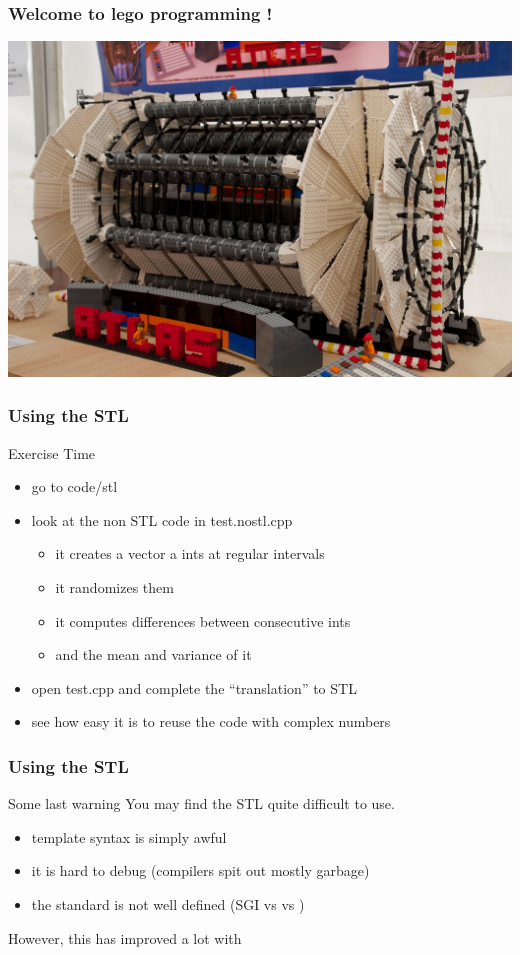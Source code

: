\begin{frame}[fragile]
  \frametitle{Welcome to lego programming !}
  \begin{block}{}
    \includegraphics[width=\linewidth]{AtlasLego}
  \end{block}
\end{frame}

\begin{frame}[fragile]
  \frametitle{Using the STL}
  \begin{alertblock}{Exercise Time}
    \begin{itemize}
    \item go to code/stl
    \item look at the non STL code in test.nostl.cpp 
      \begin{itemize}
        \item it creates a vector a ints at regular intervals
        \item it randomizes them
        \item it computes differences between consecutive ints
        \item and the mean and variance of it
      \end{itemize}
    \item open test.cpp and complete the ``translation'' to STL
    \item see how easy it is to reuse the code with complex numbers
    \end{itemize}
  \end{alertblock}
\end{frame}

\begin{frame}[fragile]
  \frametitle{Using the STL}
  \begin{alertblock}{Some last warning}
    You may find the STL quite difficult to use.
    \begin{itemize}
    \item template syntax is simply awful
    \item it is hard to debug (compilers spit out mostly garbage)
    \item the standard is not well defined (SGI vs  vs )
    \end{itemize}
    However, this has improved a lot with 
  \end{alertblock}
\end{frame}

